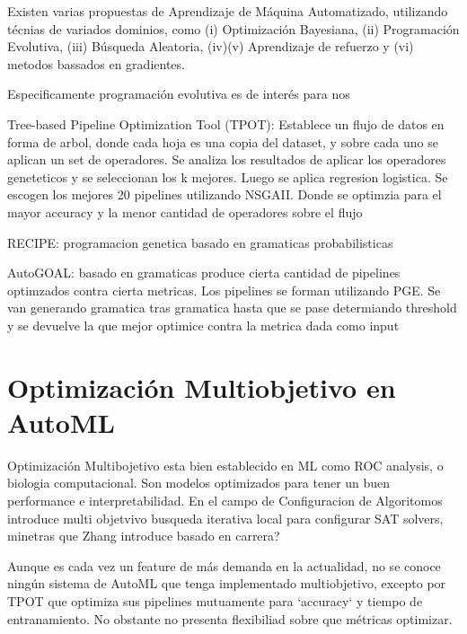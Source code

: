 
Existen varias propuestas de Aprendizaje de M\'aquina Automatizado, utilizando t\'ecnias de variados dominios, como (i) Optimizaci\'on Bayesiana, (ii) Programaci\'on Evolutiva, (iii) B\'usqueda Aleatoria, (iv)(v) Aprendizaje de refuerzo y (vi) metodos bassados en gradientes.


Especificamente programaci\'on evolutiva es de inter\'es para nos 

Tree-based Pipeline Optimization Tool (TPOT): Establece un flujo de datos en forma de arbol, donde cada hoja es una copia del dataset, y sobre cada uno se aplican un set de operadores. Se analiza los resultados de aplicar los operadores geneteticos y se seleccionan los k mejores. Luego se aplica regresion logistica. Se escogen los mejores 20 pipelines utilizando NSGAII. Donde se optimzia para el mayor accuracy y la menor cantidad de operadores sobre el flujo

RECIPE: programacion genetica basado en gramaticas probabilisticas

AutoGOAL: basado en gramaticas produce cierta cantidad de pipelines optimzados contra cierta metricas. Los pipelines se forman utilizando PGE. Se van generando gramatica tras gramatica hasta que se pase determiando threshold y se devuelve la que mejor optimice contra la metrica dada como input


\section{Optimizaci\'on Multiobjetivo en AutoML}


Optimizaci\'on Multibojetivo esta bien establecido en ML como ROC analysis, o biologia computacional. Son modelos optimizados para tener un buen performance e interpretabilidad.
En el campo de Configuracion de Algoritomos introduce multi objetvivo busqueda iterativa local para configurar SAT solvers, minetras que Zhang introduce basado en carrera?

Aunque es cada vez un feature de m\'as demanda en la actualidad, no se conoce ning\'un sistema de AutoML que tenga implementado multiobjetivo, excepto por TPOT que optimiza sus pipelines mutuamente para `accuracy` y tiempo de entranamiento. No obstante no presenta flexibiliad sobre que m\'etricas optimizar.


